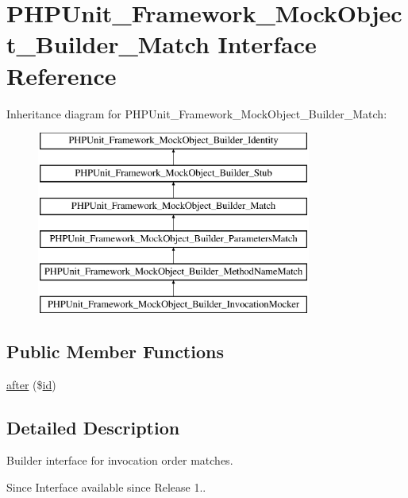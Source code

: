 \hypertarget{interface_p_h_p_unit___framework___mock_object___builder___match}{}\section{P\+H\+P\+Unit\+\_\+\+Framework\+\_\+\+Mock\+Object\+\_\+\+Builder\+\_\+\+Match Interface Reference}
\label{interface_p_h_p_unit___framework___mock_object___builder___match}
Inheritance diagram for P\+H\+P\+Unit\+\_\+\+Framework\+\_\+\+Mock\+Object\+\_\+\+Builder\+\_\+\+Match\+:\begin{figure}[H]
\begin{center}
\leavevmode
\includegraphics[height=6.000000cm]{interface_p_h_p_unit___framework___mock_object___builder___match}
\end{center}
\end{figure}
\subsection*{Public Member Functions}
\begin{DoxyCompactItemize}
\item 
\mbox{\hyperlink{interface_p_h_p_unit___framework___mock_object___builder___match_a02176c9b6e2cdc241de069df4423a683}{after}} (\$\mbox{\hyperlink{interface_p_h_p_unit___framework___mock_object___builder___identity_a6ff64f57bb98d1f8903290a95f22dc43}{id}})
\end{DoxyCompactItemize}


\subsection{Detailed Description}
Builder interface for invocation order matches.

\begin{DoxySince}{Since}
Interface available since Release 1.. 
\end{DoxySince}


